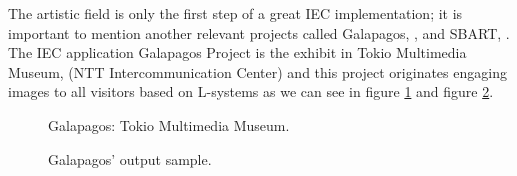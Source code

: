 The artistic field is only the first step of a great IEC implementation; it is
important to mention another relevant projects called Galapagos, \cite{sims1997interactivity},
and SBART, \cite{unemi2000sbart}. The IEC application Galapagos Project is the exhibit in
Tokio Multimedia Museum, (NTT Intercommunication Center) and this project
originates engaging images to all visitors based on L-systems as we can see in figure \ref{fig:Galapagos1} 
and figure \ref{fig:Galapagos2}.

\begin{figure}
\captionsetup{justification=centering,margin=2cm}
\centering
\setlength\fboxsep{0pt}
\setlength\fboxrule{0.7pt}
\caption{Galapagos: Tokio Multimedia Museum.}
\label{fig:Galapagos1}       
\end{figure}

\begin{figure}
\captionsetup{justification=centering,margin=2cm}
\centering
\setlength\fboxsep{0pt}
\setlength\fboxrule{0.7pt}
\caption{Galapagos' output sample.}
\label{fig:Galapagos2}       
\end{figure}

